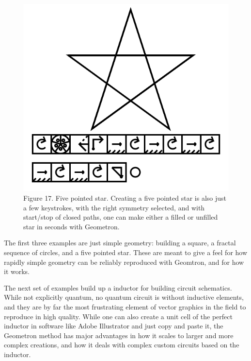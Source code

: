 \documentclass[11pt]{article}
\begin{document}
\begin{figure}

\includegraphics[width=\linewidth]{figures/figure17_star.png}

\caption{Figure 17. Five pointed star.  Creating a five pointed star is also just a few keystrokes, with the right symmetry selected, and with start/stop of closed paths, one can make either a filled or unfilled star in seconds with Geometron.}
\end{figure}





    The first three examples are just simple geometry: building a square, a fractal sequence of circles, and a five pointed star.  These are meant to give a feel for how rapidly simple geometry can be reliably reproduced with Geomtron, and for how it works.  




    The next set of examples build up a inductor for building circuit schematics.  While not explicitly quantum, no quantum circuit is without inductive elements, and they are by far the most frustrating element of vector graphics in the field to reproduce in high quality.  While one can also create a unit cell of the perfect inductor in software like Adobe Illustrator and just copy and paste it, the Geometron method has major advantages in how it scales to larger and more complex creations, and how it deals with complex custom circuits based on the inductor.   
\end{document}
